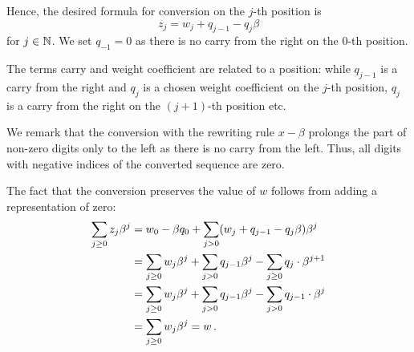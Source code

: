     Hence, the desired formula for conversion on the $j$-th position is 
    \begin{equation*}
        z_j=w_j + q_{j-1} - q_j \beta
    \end{equation*}
    for $j \in \mathbb{N}$. We set $q_{-1}=0$ as there is no carry from the right on the 0-th position.
    
     The terms carry and weight coefficient are related to a position: while $q_{j-1}$ is a carry from the right  and $q_j$ is a chosen weight coefficient on the $j$-th position, $q_j$ is a carry from the right on the $(j+1)$-th position etc.

We remark that the conversion with the rewriting rule $x-\beta$ prolongs the part of non-zero digits only to the left as there is no carry from the left. Thus, all digits with negative indices of the converted sequence are zero.


     The fact that the conversion preserves the value of $w$ follows from adding a representation of zero:
\begin{align}
\label{eq:valuePreserving}
    \sum_{j\geq 0} z_j \beta^j &=w_0 - \beta q_0 + \sum_{j> 0} (w_j + q_{j-1} - q_j \beta) \beta^j \notag\\
    &=\sum_{j\geq 0} w_j \beta^j + \sum_{j>0} q_{j-1} \beta^j - \sum_{j\geq 0} q_j \cdot \beta^{j+1}  \\
    &=\sum_{j\geq 0} w_j \beta^j + \sum_{j>0} q_{j-1} \beta^j - \sum_{j> 0} q_{j-1} \cdot \beta^j \notag\\
    &=\sum_{j\geq 0} w_j \beta^j = w\,. \notag
\end{align}

